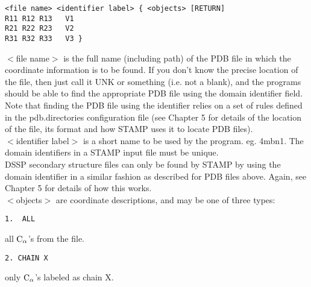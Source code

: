 \begin{scriptsize}\begin{verbatim}
<file name> <identifier label> { <objects> [RETURN]
R11 R12 R13   V1
R21 R22 R23   V2
R31 R32 R33   V3 }
\end{verbatim} \end{scriptsize}

$<$file name$>$ is the full name (including path) of the PDB file in
which the coordinate information is to be found.  If you don't know the 
precise location of the file, then just call it UNK or something (i.e. 
not a blank), and the programs should be able to find the appropriate PDB 
file using the domain identifier field. Note that finding the PDB file
using the identifier relies on a set of rules defined in the 
pdb.directories configuration file (see Chapter 5 for details of
the location of the file, its format and how STAMP uses it to locate
PDB files).\\

$<$identifier label$>$ is a short name to be used by the program. 
eg. 4mbn1. The domain identifiers in a STAMP input file must be unique.\\

DSSP secondary structure files can only be found by STAMP by using
the domain identifier in a similar fashion as described for PDB files
above. Again, see Chapter 5 for details of how this works. 
\\
$<$objects$>$ are coordinate descriptions, and may be one of three types:

\begin{scriptsize}\begin{verbatim}
1.  ALL  
\end{verbatim} \end{scriptsize}
all ${\rm C}_{\alpha}$'s from the file.\\

\begin{scriptsize}\begin{verbatim}
2. CHAIN X 
\end{verbatim} \end{scriptsize}
only ${\rm C}_{\alpha}$'s labeled as chain X.\\

